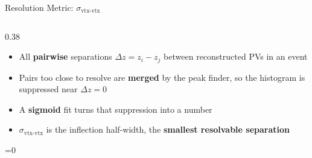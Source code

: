 \documentclass[xcolor=table,aspectratio=169]{beamer}
\providecommand{\talkbuild}{0}
\newcommand{\readingonly}[1]{\ifnum\talkbuild=0\relax#1\fi}
\begin{document}
\begin{frame}{Resolution Metric: \(\sigma_{\text{vtx-vtx}}\)}
    \begin{columns}[c]
        \begin{column}{0.38\linewidth}
            \footnotesize
            \begin{itemize}
                \setlength\itemsep{0.45em}
                \item All \textbf{pairwise} separations $\Delta z = z_i - z_j$ between
                    reconstructed PVs in an event
                \item Pairs too close to resolve are \textbf{merged} by the peak finder,
                    so the histogram is suppressed near $\Delta z = 0$
                \item A \textbf{sigmoid} fit turns that suppression into a number
                \item $\sigma_{\text{vtx-vtx}}$ is the inflection half-width, the
                    \textbf{smallest resolvable separation}
            \end{itemize}
            \readingonly{\vspace{0.6em}

}
\end{column}
\end{columns}
\end{frame}
\end{document}
